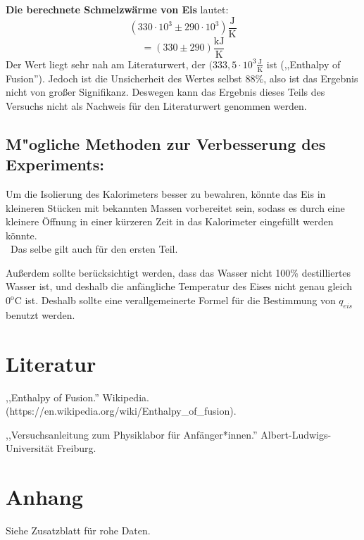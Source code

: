 \documentclass[11pt,a4paper]{article} %
\begin{document}
\textbf{Die berechnete Schmelzw\"arme von Eis} lautet:
$$(330\cdot10^{3} \pm 290\cdot10^{3}) \mathrm{\frac{J}{K}}$$
$$=(330 \pm 290) \mathrm{\frac{kJ}{K}}$$
Der Wert liegt sehr nah am  Literaturwert, der $(333,5\cdot10^{3}\mathrm{\frac{J}{K}}$ ist (,,Enthalpy of Fusion'').
Jedoch ist die Unsicherheit des Wertes selbst $88\%$, also ist das Ergebnis nicht von gro{\ss}er Signifikanz. Deswegen kann das Ergebnis dieses Teils des Versuchs nicht als Nachweis für den Literaturwert genommen werden.

\subsection{M"ogliche Methoden zur Verbesserung des Experiments: }

Um die Isolierung des Kalorimeters besser zu bewahren, könnte das Eis in kleineren Stücken mit bekannten Massen vorbereitet sein, sodass es durch eine kleinere Öffnung in einer kürzeren Zeit in das Kalorimeter eingef\"ullt werden könnte.
\\\
Das selbe gilt auch f\"ur den ersten Teil.

Außerdem sollte berücksichtigt werden, dass das Wasser nicht 100\% destilliertes Wasser ist, und deshalb die anf\"angliche Temperatur des Eises nicht genau gleich $0^{\mathrm{o}}$C ist. Deshalb sollte eine verallgemeinerte Formel f\"ur die Bestimmung von $q_{eis}$ benutzt werden.




\section{Literatur}
,,Enthalpy of Fusion.'' Wikipedia. (https://en.wikipedia.org/wiki/Enthalpy\_of\_fusion).

,,Versuchsanleitung zum Physiklabor für Anfänger*innen.'' Albert-Ludwigs-Universität Freiburg. 
\section{Anhang}
Siehe Zusatzblatt für rohe Daten.
\end{document}
